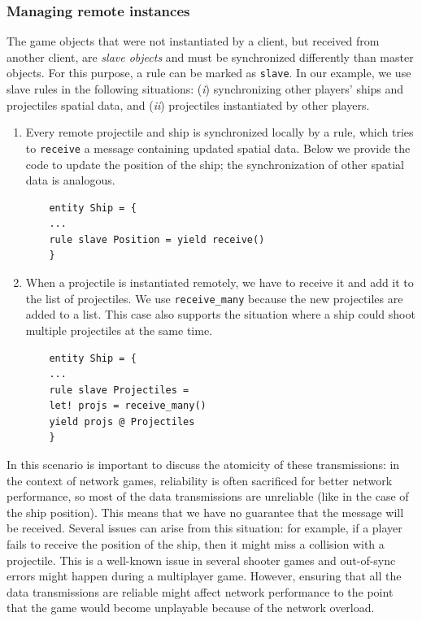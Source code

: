 \subsubsection{Managing remote instances}
The game objects that were not instantiated by a client, but received from another client, are \textit{slave objects} and must be synchronized differently than master objects. For this purpose, a rule can be marked as \texttt{slave}. In our example, we use slave rules in the following situations: (\textit{i}) synchronizing other players' ships and projectiles spatial data, and (\textit{ii}) projectiles instantiated by other players.

\begin{enumerate}
	\item Every remote projectile and ship is synchronized locally by a rule, which tries to \texttt{receive} a message containing updated spatial data. Below we provide the code to update the position of the ship; the synchronization of other spatial data is analogous.
	
	\begin{lstlisting}
	entity Ship = {
	...
	rule slave Position = yield receive()
	}
	\end{lstlisting}
	
	\item When a projectile is instantiated remotely, we have to receive it and add it to the list of projectiles. We use \texttt{receive\_many} because the new projectiles are added to a list. This case also supports the situation where a ship could shoot multiple projectiles at the same time.
	
	\begin{lstlisting}
	entity Ship = {
	...
	rule slave Projectiles =
	let! projs = receive_many()
	yield projs @ Projectiles
	}
	\end{lstlisting}
\end{enumerate}

In this scenario is important to discuss the atomicity of these transmissions: in the context of network games, reliability is often sacrificed for better network performance, so most of the data transmissions are unreliable (like in the case of the ship position). This means that we have no guarantee that the message will be received. Several issues can arise from this situation: for example, if a player fails to receive the position of the ship, then it might miss a collision with a projectile. This is a well-known issue in several shooter games and out-of-sync errors might happen during a multiplayer game. However, ensuring that all the data transmissions are reliable might affect network performance to the point that the game would become unplayable because of the network overload. 

